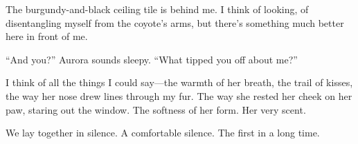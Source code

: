 The burgundy-and-black ceiling tile is behind me. I think of looking, of disentangling myself from the coyote's arms, but there's something much better here in front of me.

``And you?'' Aurora sounds sleepy. ``What tipped you off about me?''

I think of all the things I could say---the warmth of her breath, the trail of kisses, the way her nose drew lines through my fur. The way she rested her cheek on her paw, staring out the window. The softness of her form. Her very scent.

We lay together in silence. A comfortable silence. The first in a long time.
